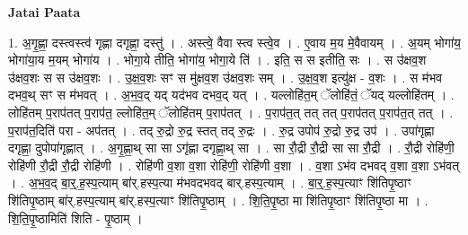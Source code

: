 \documentclass[17pt]{extarticle}
\begin{document}
\textbf{Jatai Paata} \newline

1. अ॒गृ॒ह्णा॒ दस्त्वस्त्व॑ गृह्णा दगृह्णा॒ दस्तु॑ । . अस्त्वे॒ वैवा स्त्व स्त्वे॒व । . ए॒वाय म॒य मे॒वैवायम् । . अ॒यम् भोगा॑य॒ भोगा॑या॒य म॒यम् भोगा॑य । . भोगा॒ये तीति॒ भोगा॑य॒ भोगा॒ये ति॑ । . इति॒ स स इतीति॒ सः । . स उ॑क्षव॒श उ॑क्षव॒शः स स उ॑क्षव॒शः । . उ॒क्ष॒व॒शः सꣳ स मु॑क्षव॒श उ॑क्षव॒शः सम् । . उ॒क्ष॒व॒श इत्यु॑क्ष - व॒शः । . स म॑भव दभव॒थ् सꣳ स म॑भवत् । . अ॒भ॒व॒द् यद् यद॑भव दभव॒द् यत् । . यल्लोहि॑त॒म् ॅलोहि॑तं॒ ॅयद् यल्लोहि॑तम् । . लोहि॑तम् प॒राप॑तत् प॒राप॑त॒ ल्लोहि॑त॒म् ॅलोहि॑तम् प॒राप॑तत् । . प॒राप॑त॒त् तत् तत् प॒राप॑तत् प॒राप॑त॒त् तत् । . प॒राप॑त॒दिति॑ परा - अप॑तत् । . तद् रु॒द्रो रु॒द्र स्तत् तद् रु॒द्रः । . रु॒द्र उपोप॑ रु॒द्रो रु॒द्र उप॑ । . उपा॑गृह्णा दगृह्णा॒ दुपोपा॑गृह्णात् । . अ॒गृ॒ह्णा॒थ् सा सा ऽगृ॑ह्णा दगृह्णा॒थ् सा । . सा रौ॒द्री रौ॒द्री सा सा रौ॒द्री । . रौ॒द्री रोहि॑णी॒ रोहि॑णी रौ॒द्री रौ॒द्री रोहि॑णी । . रोहि॑णी व॒शा व॒शा रोहि॑णी॒ रोहि॑णी व॒शा । . व॒शा ऽभ॑व दभवद् व॒शा व॒शा ऽभ॑वत् । . अ॒भ॒व॒द् बा॒र्॒.ह॒स्प॒त्याम् बा॑र्.हस्प॒त्या म॑भवदभवद् बार्.हस्प॒त्याम् । . बा॒र्॒.ह॒स्प॒त्याꣳ शि॑तिपृ॒ष्ठाꣳ शि॑तिपृ॒ष्ठाम् बा॑र्.हस्प॒त्याम् बा॑र्.हस्प॒त्याꣳ शि॑तिपृ॒ष्ठाम् । . शि॒ति॒पृ॒ष्ठा मा शि॑तिपृ॒ष्ठाꣳ शि॑तिपृ॒ष्ठा मा । . शि॒ति॒पृ॒ष्ठामिति॑ शिति - पृ॒ष्ठाम् । \newline
\end{document}
